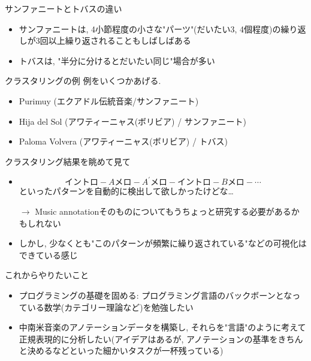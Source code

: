 \documentclass[dvipdfmx,11pt]{beamer}
\theoremstyle{definition}
\begin{document}
\begin{frame}{サンファニートとトバスの違い}
\begin{itemize}
\item サンファニートは, 4小節程度の小さな"パーツ"(だいたい3, 4個程度)の繰り返しが3回以上繰り返されることもしばしばある
\item トバスは, "半分に分けるとだいたい同じ"場合が多い
\end{itemize}
\end{frame}

\begin{frame}{クラスタリングの例}
例をいくつかあげる.
\begin{itemize}
\item Purimuy (エクアドル伝統音楽/サンファニート)
\item Hija del Sol (アワティーニャス(ボリビア) / サンファニート)
\item Paloma Volvera (アワティーニャス(ボリビア) / トバス)
\end{itemize}
\end{frame}

\begin{frame}{クラスタリング結果を眺めて見て}
\begin{itemize}
\item $$\text{イントロ} - A\text{メロ} - A^{\prime}\text{メロ} - \text{イントロ} - B\text{メロ} - \cdots$$
といったパターンを自動的に検出して欲しかったけどな…

$\rightarrow$ Music annotationそのものについてもうちょっと研究する必要があるかもしれない 
\item しかし, 少なくとも"このパターンが頻繁に繰り返されている"などの可視化はできている感じ
\end{itemize}
\end{frame}

\begin{frame}{これからやりたいこと}
\begin{itemize}
\item プログラミングの基礎を固める: プログラミング言語のバックボーンとなっている数学(カテゴリー理論など)を勉強したい
\item 中南米音楽のアノテーションデータを構築し, それらを"言語"のように考えて正規表現的に分析したい(アイデアはあるが, アノテーションの基準をきちんと決めるなどといった細かいタスクが一杯残っている)
\end{itemize}
\end{frame}
\end{document}
